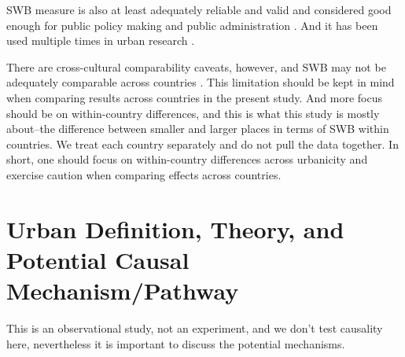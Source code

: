 \documentclass[10pt, letterpaper]{article}
\begin{document}
SWB measure is also at least adequately reliable and valid and considered good
enough for public policy making and public administration
\citep{diener09,stiglitz09al}. And it has been used multiple times in urban
research \citep[e.g.,][]{moeinaddini20,mouratidis19,wang19,anon17-cities-oslo,ma17,wkeziak16,valente16,chen15}.

There are cross-cultural comparability caveats, however, and SWB may not be
adequately comparable across countries \citep{kahneman99,diener09}. This limitation should be kept in
mind when comparing results across countries in the present study. And more
focus should be on within-country differences, and this is what this study is
mostly about--the difference between smaller and larger places in terms of SWB
within countries. We treat each country separately and do not pull the data
together. In short, one should focus on within-country differences across
urbanicity and exercise caution when comparing effects across countries. 

\section{Urban Definition, Theory, and Potential Causal Mechanism/Pathway}

{This
  is an observational study, not an experiment, and we don't test causality here,
  nevertheless it is important to discuss the potential mechanisms.}
\end{document}
